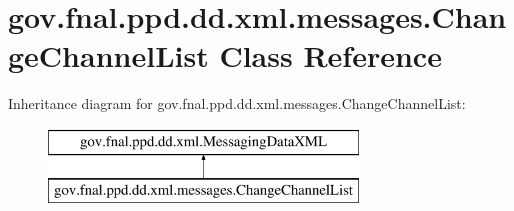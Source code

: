 \hypertarget{classgov_1_1fnal_1_1ppd_1_1dd_1_1xml_1_1messages_1_1ChangeChannelList}{\section{gov.\-fnal.\-ppd.\-dd.\-xml.\-messages.\-Change\-Channel\-List Class Reference}
\label{classgov_1_1fnal_1_1ppd_1_1dd_1_1xml_1_1messages_1_1ChangeChannelList}
}
Inheritance diagram for gov.\-fnal.\-ppd.\-dd.\-xml.\-messages.\-Change\-Channel\-List\-:\begin{figure}[H]
\begin{center}
\leavevmode
\includegraphics[height=2.000000cm]{classgov_1_1fnal_1_1ppd_1_1dd_1_1xml_1_1messages_1_1ChangeChannelList}
\end{center}
\end{figure}
